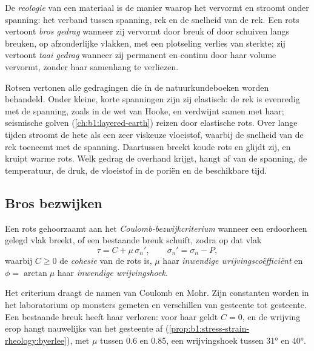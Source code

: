 \begin{definition}\label{def:b1:stress-strain-rheology:rheology}
De \emph{reologie} van een materiaal is de manier waarop het vervormt en stroomt onder spanning: het verband tussen spanning, rek en de snelheid van de rek. Een rots vertoont \emph{bros gedrag} wanneer zij vervormt door breuk of door schuiven langs breuken, op afzonderlijke vlakken, met een plotseling verlies van sterkte; zij vertoont \emph{taai gedrag} wanneer zij permanent en continu door haar volume vervormt, zonder haar samenhang te verliezen.
\end{definition}

Rotsen vertonen alle gedragingen die in de natuurkundeboeken worden behandeld. Onder kleine, korte spanningen zijn zij elastisch: de rek is evenredig met de spanning, zoals in de wet van Hooke, en verdwijnt samen met haar; seismische golven (\cref{ch:b1:layered-earth}) reizen door elastische rots. Over lange tijden stroomt de hete  als een zeer viskeuze vloeistof, waarbij de snelheid van de rek toeneemt met de spanning. Daartussen breekt koude rots en glijdt zij, en kruipt warme rots. Welk gedrag de overhand krijgt, hangt af van de spanning, de temperatuur, de druk, de vloeistof in de poriën en de beschikbare tijd.

\subsection*{Bros bezwijken}

\begin{definition}\label{def:b1:stress-strain-rheology:coulomb}
Een rots gehoorzaamt aan het \emph{Coulomb-bezwijkcriterium} wanneer een erdoorheen gelegd vlak breekt, of een bestaande breuk schuift, zodra op dat vlak
\[
  \tau = C + \mu\,\sigma_n' , \qquad \sigma_n' = \sigma_n - P ,
\]
waarbij $C \ge 0$ de \emph{cohesie} van de rots is, $\mu$ haar \emph{inwendige wrijvingscoëfficiënt} en $\phi = \arctan\mu$ haar \emph{inwendige wrijvingshoek}.
\end{definition}

Het criterium draagt de namen van Coulomb en Mohr. Zijn constanten worden in het laboratorium op monsters gemeten en verschillen van gesteente tot gesteente. Een bestaande breuk heeft haar  verloren: voor haar geldt $C = 0$, en de wrijving erop hangt nauwelijks van het gesteente af (\cref{prop:b1:stress-strain-rheology:byerlee}), met $\mu$ tussen 0.6 en 0.85, een wrijvingshoek tussen \ang{31} en \ang{40}.


